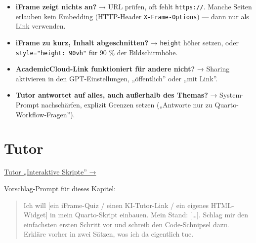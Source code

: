 \documentclass[
  ngerman,
  a4paper,
  DIV=11]{scrreprt}
\providecommand{\tightlist}{%
  \setlength{\itemsep}{0pt}\setlength{\parskip}{0pt}}
\begin{document}
\begin{tcolorbox}[enhanced jigsaw, opacitybacktitle=0.6, leftrule=.75mm, title=\textcolor{quarto-callout-warning-color}{\faExclamationTriangle}\hspace{0.5em}{Was, wenn \ldots{}}, colframe=quarto-callout-warning-color-frame, arc=.35mm, toprule=.15mm, colbacktitle=quarto-callout-warning-color!10!white, bottomrule=.15mm, colback=white, rightrule=.15mm, breakable, toptitle=1mm, bottomtitle=1mm, opacityback=0, titlerule=0mm, coltitle=black, left=2mm]

\begin{itemize}
\tightlist
\item
  \textbf{iFrame zeigt nichts an?} → URL prüfen, oft fehlt
  \texttt{https://}. Manche Seiten erlauben kein Embedding (HTTP-Header
  \texttt{X-Frame-Options}) --- dann nur als Link verwenden.
\item
  \textbf{iFrame zu kurz, Inhalt abgeschnitten?} → \texttt{height} höher
  setzen, oder \texttt{style="height:\ 90vh"} für 90 \% der
  Bildschirmhöhe.
\item
  \textbf{AcademicCloud-Link funktioniert für andere nicht?} → Sharing
  aktivieren in den GPT-Einstellungen, „öffentlich'' oder „mit Link''.
\item
  \textbf{Tutor antwortet auf alles, auch außerhalb des Themas?} →
  System-Prompt nachschärfen, explizit Grenzen setzen („Antworte nur zu
  Quarto-Workflow-Fragen'').
\end{itemize}

\end{tcolorbox}

\section{Tutor}\label{tutor-5}

\begin{tcolorbox}[enhanced jigsaw, opacitybacktitle=0.6, leftrule=.75mm, title=\textcolor{quarto-callout-tip-color}{\faLightbulb}\hspace{0.5em}{Tutor öffnen}, colframe=quarto-callout-tip-color-frame, arc=.35mm, toprule=.15mm, colbacktitle=quarto-callout-tip-color!10!white, bottomrule=.15mm, colback=white, rightrule=.15mm, breakable, toptitle=1mm, bottomtitle=1mm, opacityback=0, titlerule=0mm, coltitle=black, left=2mm]

\href{https://chatgpt.com/g/g-69fec93348108191af1ffb8ce0cf6712-tutor-interaktive-skripte}{Tutor
„Interaktive Skripte'' →}

Vorschlag-Prompt für dieses Kapitel:

\begin{quote}
Ich will {[}ein iFrame-Quiz / einen KI-Tutor-Link / ein eigenes
HTML-Widget{]} in mein Quarto-Skript einbauen. Mein Stand: {[}\ldots{]}.
Schlag mir den einfachsten ersten Schritt vor und schreib den
Code-Schnipsel dazu. Erkläre vorher in zwei Sätzen, was ich da
eigentlich tue.
\end{quote}

\end{tcolorbox}
\end{document}
